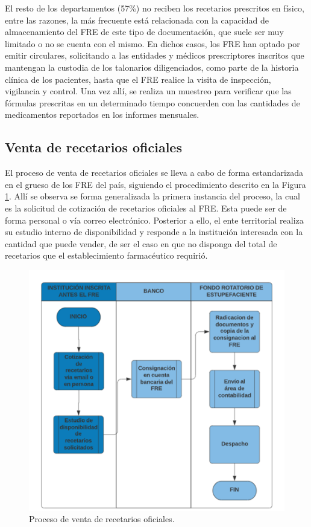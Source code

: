 \documentclass[
]{book}
\begin{document}
El resto de los departamentos (57\%) no reciben los recetarios prescritos en físico, entre las razones, la más frecuente está relacionada con la capacidad de almacenamiento del FRE de este tipo de documentación, que suele ser muy limitado o no se cuenta con el mismo. En dichos casos, los FRE han optado por emitir circulares, solicitando a las entidades y médicos prescriptores inscritos que mantengan la custodia de los talonarios diligenciados, como parte de la historia clínica de los pacientes, hasta que el FRE realice la visita de inspección, vigilancia y control. Una vez allí, se realiza un muestreo para verificar que las fórmulas prescritas en un determinado tiempo concuerden con las cantidades de medicamentos reportados en los informes mensuales.

\hypertarget{venta-de-recetarios-oficiales}{%
\subsection{Venta de recetarios oficiales}\label{venta-de-recetarios-oficiales}}

El proceso de venta de recetarios oficiales se lleva a cabo de forma estandarizada en el grueso de los FRE del país, siguiendo el procedimiento descrito en la Figura \ref{fig:procesoVentaRec}. Allí se observa se forma generalizada la primera instancia del proceso, la cual es la solicitud de cotización de recetarios oficiales al FRE. Esta puede ser de forma personal o vía correo electrónico. Posterior a ello, el ente territorial realiza su estudio interno de disponibilidad y responde a la institución interesada con la cantidad que puede vender, de ser el caso en que no disponga del total de recetarios que el establecimiento farmacéutico requirió.

\begin{figure}

{\centering \includegraphics[width=0.8\linewidth]{figures/procesoVentaREC} 

}

\caption{Proceso de venta de recetarios oficiales.}\label{fig:procesoVentaRec}
\end{figure}
\end{document}
